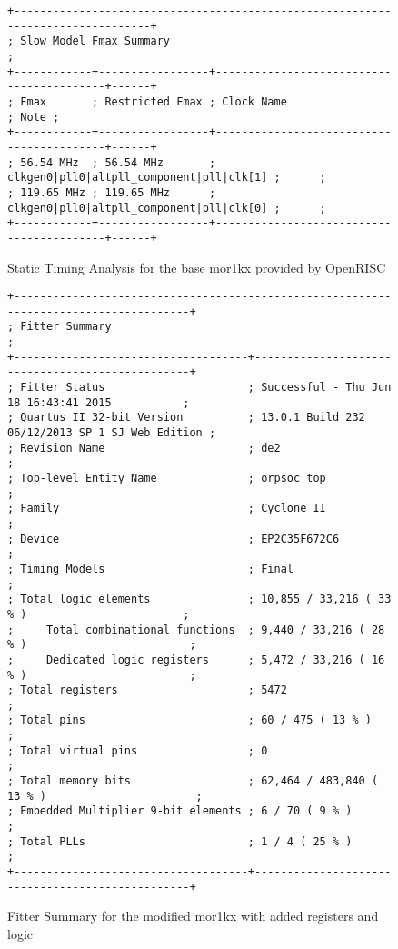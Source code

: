\begin{figure}[p]
  \centering
  \footnotesize
  \begin{verbatim}
+--------------------------------------------------------------------------------+
; Slow Model Fmax Summary                                                        ;
+------------+-----------------+------------------------------------------+------+
; Fmax       ; Restricted Fmax ; Clock Name                               ; Note ;
+------------+-----------------+------------------------------------------+------+
; 56.54 MHz  ; 56.54 MHz       ; clkgen0|pll0|altpll_component|pll|clk[1] ;      ;
; 119.65 MHz ; 119.65 MHz      ; clkgen0|pll0|altpll_component|pll|clk[0] ;      ;
+------------+-----------------+------------------------------------------+------+
  \end{verbatim}
  \caption{Static Timing Analysis for the base mor1kx provided by OpenRISC}
  \label{fig:sta_before}
\end{figure}

\begin{figure}[p]
  \centering
  \footnotesize
  \begin{verbatim}
+--------------------------------------------------------------------------------------+
; Fitter Summary                                                                       ;
+------------------------------------+-------------------------------------------------+
; Fitter Status                      ; Successful - Thu Jun 18 16:43:41 2015           ;
; Quartus II 32-bit Version          ; 13.0.1 Build 232 06/12/2013 SP 1 SJ Web Edition ;
; Revision Name                      ; de2                                             ;
; Top-level Entity Name              ; orpsoc_top                                      ;
; Family                             ; Cyclone II                                      ;
; Device                             ; EP2C35F672C6                                    ;
; Timing Models                      ; Final                                           ;
; Total logic elements               ; 10,855 / 33,216 ( 33 % )                        ;
;     Total combinational functions  ; 9,440 / 33,216 ( 28 % )                         ;
;     Dedicated logic registers      ; 5,472 / 33,216 ( 16 % )                         ;
; Total registers                    ; 5472                                            ;
; Total pins                         ; 60 / 475 ( 13 % )                               ;
; Total virtual pins                 ; 0                                               ;
; Total memory bits                  ; 62,464 / 483,840 ( 13 % )                       ;
; Embedded Multiplier 9-bit elements ; 6 / 70 ( 9 % )                                  ;
; Total PLLs                         ; 1 / 4 ( 25 % )                                  ;
+------------------------------------+-------------------------------------------------+
  \end{verbatim}
  \caption{Fitter Summary for the modified mor1kx with added registers and logic}
  \label{fig:fit_after}
\end{figure}

